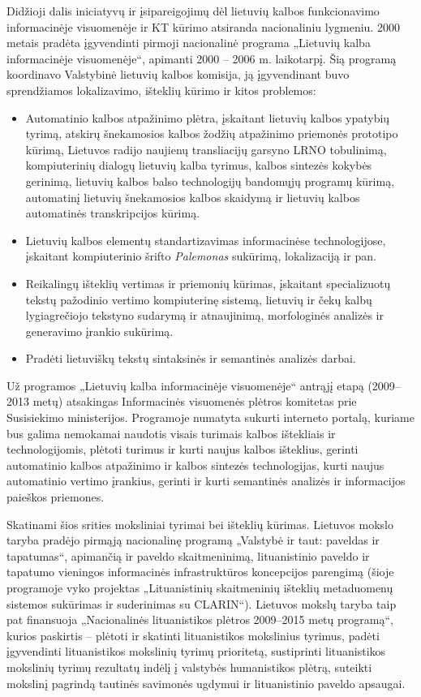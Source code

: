 \begin{multicols}{2}
Didžioji dalis iniciatyvų ir įsipareigojimų dėl lietuvių kalbos funkcionavimo informacinėje visuomenėje ir KT kūrimo atsiranda nacionaliniu lygmeniu. 2000 metais pradėta įgyvendinti pirmoji nacionalinė programa „Lietuvių kalba informacinėje visuomenėje“, apimanti 2000 – 2006 m. laikotarpį. Šią programą koordinavo Valstybinė lietuvių kalbos komisija, ją įgyvendinant buvo sprendžiamos lokalizavimo, išteklių kūrimo ir kitos problemos:
\begin{itemize}
      \item Automatinio kalbos atpažinimo plėtra, įskaitant lietuvių kalbos ypatybių tyrimą, atskirų šnekamosios kalbos žodžių atpažinimo priemonės prototipo kūrimą, Lietuvos radijo naujienų transliacijų garsyno LRNO tobulinimą, kompiuterinių dialogų lietuvių kalba tyrimus, kalbos sintezės kokybės gerinimą, lietuvių kalbos balso technologijų bandomųjų programų kūrimą, automatinį lietuvių šnekamosios kalbos skaidymą ir lietuvių kalbos automatinės transkripcijos kūrimą.
      \item Lietuvių kalbos elementų standartizavimas informacinėse technologijose, įskaitant kompiuterinio šrifto \textit{Palemonas} sukūrimą, lokalizaciją ir pan.
      \item Reikalingų išteklių vertimas ir priemonių kūrimas, įskaitant specializuotų tekstų pažodinio vertimo kompiuterinę sistemą, lietuvių ir čekų kalbų lygiagrečiojo tekstyno sudarymą ir atnaujinimą, morfologinės analizės ir generavimo įrankio sukūrimą.
      \item Pradėti lietuviškų tekstų sintaksinės ir semantinės analizės darbai. 
          \end{itemize}

    Už programos „Lietuvių kalba informacinėje visuomenėje“ antrąjį etapą (2009–2013 metų) atsakingas Informacinės visuomenės plėtros komitetas prie Susisiekimo ministerijos. Programoje numatyta sukurti interneto portalą, kuriame bus galima nemokamai naudotis visais turimais kalbos ištekliais ir technologijomis, plėtoti turimus ir kurti naujus kalbos išteklius, gerinti automatinio kalbos atpažinimo ir kalbos sintezės technologijas, kurti naujus automatinio vertimo įrankius, gerinti ir kurti semantinės analizės ir informacijos paieškos priemones.

Skatinami šios srities moksliniai tyrimai bei išteklių kūrimas. Lietuvos mokslo taryba pradėjo pirmąją nacionalinę programą „Valstybė ir taut: paveldas ir tapatumas“, apimančią ir paveldo skaitmeninimą, lituanistinio paveldo ir tapatumo vieningos informacinės infrastruktūros koncepcijos parengimą (šioje programoje vyko projektas „Lituanistinių skaitmeninių išteklių metaduomenų sistemos sukūrimas ir suderinimas su CLARIN“). Lietuvos mokslų taryba taip pat finansuoja „Nacionalinės lituanistikos plėtros 2009–2015 metų programą“, kurios paskirtis – plėtoti ir skatinti lituanistikos mokslinius tyrimus, padėti įgyvendinti lituanistikos mokslinių tyrimų prioritetą, sustiprinti lituanistikos mokslinių tyrimų rezultatų indėlį į valstybės humanistikos plėtrą, suteikti mokslinį pagrindą tautinės savimonės ugdymui ir lituanistinio paveldo apsaugai. 


\end{multicols}
